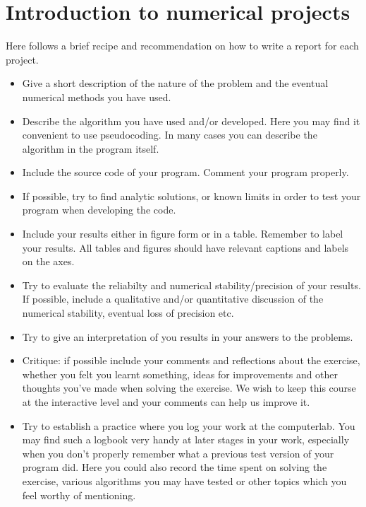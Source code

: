 \documentclass[11pt,a4wide]{article}
\begin{document}
\section*{Introduction to numerical projects}

Here follows a brief recipe and recommendation on how to write a report for each
project.
\begin{itemize}
\item Give a short description of the nature of the problem and the eventual 
numerical methods you have used.
\item Describe the algorithm you have used and/or developed. Here you may find it convenient
to use pseudocoding. In many cases you can describe the algorithm
in the program itself.

\item Include the source code of your program. Comment your program properly.
\item If possible, try to find analytic solutions, or known limits
in order to test your program when developing the code.
\item Include your results either in figure form or in a table. Remember to
       label your results. All tables and figures should have relevant captions
       and labels on the axes.
\item Try to evaluate the reliabilty and numerical stability/precision
of your results. If possible, include a qualitative and/or quantitative
discussion of the numerical stability, eventual loss of precision etc. 

\item Try to give an interpretation of you results in your answers to 
the problems.
\item Critique: if possible include your comments and reflections about the 
exercise, whether you felt you learnt something, ideas for improvements and 
other thoughts you've made when solving the exercise.
We wish to keep this course at the interactive level and your comments can help
us improve it.
\item Try to establish a practice where you log your work at the 
computerlab. You may find such a logbook very handy at later stages
in your work, especially when you don't properly remember 
what a previous test version 
of your program did. Here you could also record 
the time spent on solving the exercise, various algorithms you may have tested
or other topics which you feel worthy of mentioning.
\end{itemize}
\end{document}
